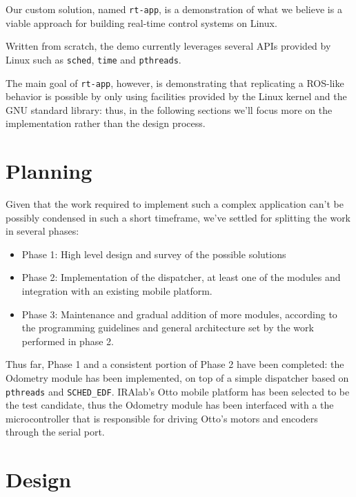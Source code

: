 \documentclass[a4paper,12pt]{report}
\begin{document}
Our custom solution, named \texttt{rt-app}, is a demonstration of what we believe is a viable approach for building real-time control systems on Linux.

Written from scratch, the demo currently leverages several APIs provided by Linux such as \texttt{sched}, \texttt{time} and \texttt{pthreads}.

The main goal of \texttt{rt-app}, however, is demonstrating that replicating a ROS-like behavior is possible by only using facilities provided by the Linux kernel and the GNU standard library: thus, in the following sections we'll focus more on the implementation rather than the design process.

\section{Planning}

Given that the work required to implement such a complex application can't be possibly condensed in such a short timeframe, we've settled for splitting the work in several phases:
\begin{itemize}
  \item Phase 1: High level design and survey of the possible solutions
  \item Phase 2: Implementation of the dispatcher, at least one of the modules and integration with an existing mobile platform.
  \item Phase 3: Maintenance and gradual addition of more modules, according to the programming guidelines and general architecture set by the work performed in phase 2.
\end{itemize}

Thus far, Phase 1 and a consistent portion of Phase 2 have been completed: the Odometry module has been implemented, on top of a simple dispatcher based on \texttt{pthreads} and \texttt{SCHED\_EDF}. IRAlab's Otto\cite{fdila-bs-otto} mobile platform has been selected to be the test candidate, thus the Odometry module has been interfaced with a the microcontroller that is responsible for driving Otto's motors and encoders through the serial port.

\section{Design}

\end{document}
